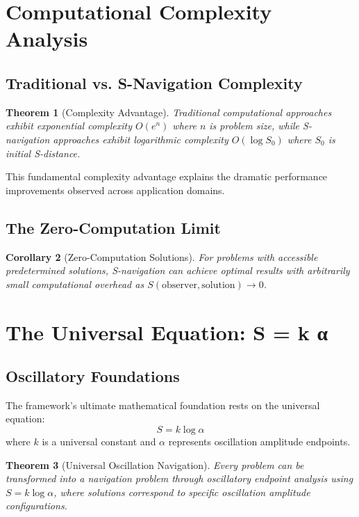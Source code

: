 \documentclass[12pt,a4paper]{article}
\newtheorem{theorem}{Theorem}
\newtheorem{corollary}[theorem]{Corollary}
\begin{document}
\section{Computational Complexity Analysis}

\subsection{Traditional vs. S-Navigation Complexity}

\begin{theorem}[Complexity Advantage]
\label{thm:complexity_advantage}
Traditional computational approaches exhibit exponential complexity $O(e^n)$ where $n$ is problem size, while S-navigation approaches exhibit logarithmic complexity $O(\log S_0)$ where $S_0$ is initial S-distance.
\end{theorem}

This fundamental complexity advantage explains the dramatic performance improvements observed across application domains.

\subsection{The Zero-Computation Limit}

\begin{corollary}[Zero-Computation Solutions]
For problems with accessible predetermined solutions, S-navigation can achieve optimal results with arbitrarily small computational overhead as $S(\text{observer}, \text{solution}) \to 0$.
\end{corollary}

\section{The Universal Equation: S = k \log α}

\subsection{Oscillatory Foundations}

The framework's ultimate mathematical foundation rests on the universal equation:
\begin{equation}
S = k \log \alpha
\end{equation}
where $k$ is a universal constant and $\alpha$ represents oscillation amplitude endpoints.

\begin{theorem}[Universal Oscillation Navigation]
\label{thm:universal_oscillation}
Every problem can be transformed into a navigation problem through oscillatory endpoint analysis using $S = k \log \alpha$, where solutions correspond to specific oscillation amplitude configurations.
\end{theorem}
\end{document}
